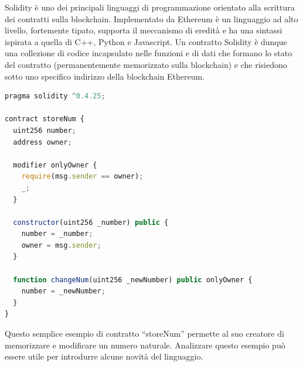 Solidity è uno dei principali linguaggi di programmazione orientato alla scrittura dei contratti sulla blockchain. Implementato da Ethereum è un linguaggio ad alto livello, fortemente tipato, supporta il meccanismo di eredità e ha una sintassi ispirata a quella di C++, Python e Javascript.
Un contratto Solidity è dunque una collezione di codice incapsulato nelle funzioni e di dati che formano lo stato del contratto (permanentemente memorizzato sulla blockchain) e che risiedono sotto uno specifico indirizzo della blockchain Ethereum.
\\
\begin{lstlisting}[caption={Esempio contratto Solidity},language=JavaScript]
pragma solidity ^0.4.25;

contract storeNum {
  uint256 number;
  address owner;

  modifier onlyOwner { 
    require(msg.sender == owner);
    _;
  }
  
  constructor(uint256 _number) public {
    number = _number;
    owner = msg.sender;
  }

  function changeNum(uint256 _newNumber) public onlyOwner {
    number = _newNumber;
  }
}
\end{lstlisting}

Questo semplice esempio di contratto “storeNum” permette al suo creatore di memorizzare e modificare un numero naturale. Analizzare questo esempio può essere utile per introdurre alcune novità del linguaggio.

